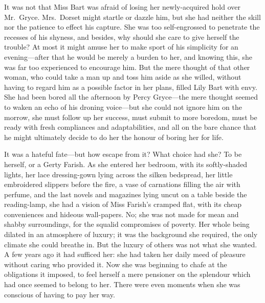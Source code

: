 \documentclass[12pt,a4paper]{book}
\begin{document}
It was not that Miss Bart was afraid of losing her newly-acquired
hold over Mr.\ Gryce. Mrs.\ Dorset might startle or dazzle him, but
she had neither the skill nor the patience to effect his capture. 
She was too self-engrossed to penetrate the recesses of his
shyness, and besides, why should she care to give herself the
trouble? At most it might amuse her to make sport of his
simplicity for an evening---after that he would be merely a burden
to her, and knowing this, she was far too experienced to
encourage him. But the mere thought of that other woman, who
could take a man up and toss him aside as she willed, without
having to regard him as a possible factor in her plans, filled
Lily Bart with envy. She had been bored all the afternoon
by Percy Gryce---the mere thought seemed to waken an echo of his
droning voice---but she could not ignore him on the morrow, she
must follow up her success, must submit to more boredom, must be
ready with fresh compliances and adaptabilities, and all on the
bare chance that he might ultimately decide to do her the honour
of boring her for life.





It was a hateful fate---but how escape from it? What choice had
she? To be herself, or a Gerty Farish. As she entered her
bedroom, with its softly-shaded lights, her lace dressing-gown
lying across the silken bedspread, her little embroidered
slippers before the fire, a vase of carnations filling the air
with perfume, and the last novels and magazines lying uncut on a
table beside the reading-lamp, she had a vision of Miss Farish's
cramped flat, with its cheap conveniences and hideous
wall-papers. No; she was not made for mean and shabby
surroundings, for the squalid compromises of poverty. Her whole
being dilated in an atmosphere of luxury; it was the background
she required, the only climate she could breathe in. But the
luxury of others was not what she wanted. A few years ago it had
sufficed her: she had taken her daily meed of pleasure without
caring who provided it. Now she was beginning to chafe at the
obligations it imposed, to feel herself a mere pensioner on the
splendour which had once seemed to belong to her. There were even
moments when she was conscious of having to pay her way.
\end{document}
